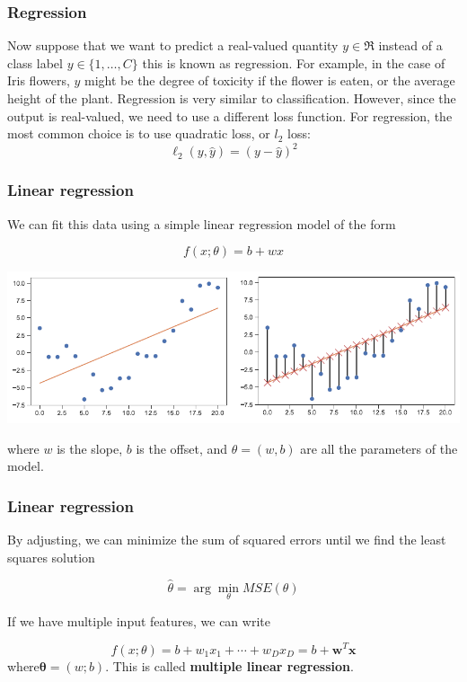 \documentclass[spanish]{beamer}
\begin{document}
\begin{frame}
\frametitle{Regression}
Now suppose that we want to predict a real-valued quantity $y\in \mathfrak{R}$ instead of a class label $y\in \lbrace 1, \ldots,C \rbrace$
this is known as regression. For example, in the case of Iris flowers, $y$ might be the degree of toxicity if the flower is eaten, or the average height of the plant.
Regression is very similar to classification. However, since the output is real-valued, we need to
use a different loss function. For regression, the most common choice is to use quadratic loss, or $l_{2}$
loss:
\begin{equation*}
\ell_{2}(y, \hat{y})=(y-\hat{y})^2
\end{equation*}


\end{frame}
\begin{frame}
\frametitle{Linear regression}
We can fit this data using a simple linear regression model of the form

\begin{equation*}
f(x;\theta)=b+wx 
\end{equation*}
\begin{center}
\includegraphics[scale=0.4]{im10}
\end{center}

where $w$ is the slope, $b$ is the offset, and $\theta= (w,b)$ are all the parameters of the model. 

\end{frame}
\begin{frame}
\frametitle{Linear regression}
By adjusting, we can minimize the sum of squared errors until we find the least squares solution

\begin{equation*}
\hat{\theta}= \arg\min_{\theta} MSE(\theta)
\end{equation*}

If we have multiple input features, we can write

\begin{equation*}
f(x;\theta) = b + w_{1}x_{1} +\cdots+ w_{D}x_{D} = b + \boldsymbol {w}^{T}\boldsymbol {x}
\end{equation*}
where$\boldsymbol {\theta}= (w; b)$. This is called \textbf{multiple linear regression}.
\end{frame}
\end{document}
